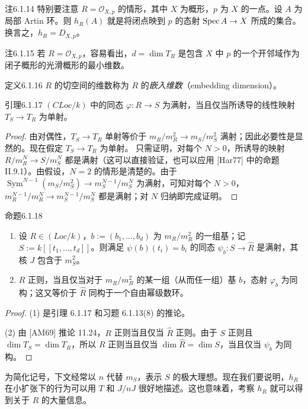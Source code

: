 \begin{origstatement}{注}{6.1.14}\label{ch06:6.1.14}
特别要注意 $R=\mathcal O_{X,p}$ 的情形，其中 $X$ 为概形，$p$ 为 $X$ 的一点。设 $A$ 为局部 Artin 环。则 $h_R(A)$ 就是将闭点映到 $p$ 的态射 $\operatorname{Spec} A\to X$ 所成的集合。换言之，$h_R=D_{X,p}$。
\end{origstatement}
\begin{origstatement}{注}{6.1.15}\label{ch06:6.1.15}
若 $R=\mathcal O_{X,p}$，容易看出，$d=\dim T_R$ 是包含 $X$ 中 $p$ 的一个开邻域作为闭子概形的光滑概形的最小维数。
\end{origstatement}
\begin{origstatement}{定义}{6.1.16}\label{ch06:6.1.16}
$R$ 的切空间的维数称为 $R$ 的\emph{嵌入维数}（embedding dimension）。
\end{origstatement}
\begin{origstatement}{引理}{6.1.17}\label{ch06:6.1.17}
$(CLoc/k)$ 中的同态 $\varphi:R\to S$ 为满射，当且仅当所诱导的线性映射 $T_S\to T_R$ 为单射。
\end{origstatement}
\begin{proof}
由对偶性，$T_S\to T_R$ 单射等价于 $m_R/m_R^2\to m_S/m_S^2$ 满射；因此必要性是显然的。现在假定 $T_S\to T_R$ 为单射。
只需证明，对每个 $N>0$，所诱导的映射 $R/m_R^N\to S/m_S^N$ 都是满射（这可以直接验证，也可以应用 [Har77] 中的命题 II.9.1）。由假设，$N=2$ 的情形是清楚的。由于 $\operatorname{Sym}^{N-1}(m_S/m_S^2)\to m_S^{N-1}/m_S^N$ 为满射，可知对每个 $N>0$，$m_R^{N-1}/m_R^N\to m_S^{N-1}/m_S^N$ 都是满射；对 $N$ 归纳即完成证明。
\end{proof}
\begin{origstatement}{命题}{6.1.18}\label{ch06:6.1.18}
\begin{enumerate}[label=(\arabic*)]
\item 设 $R\in(Loc/k)$，$b:=(b_1,\ldots,b_d)$ 为 $m_R/m_R^2$ 的一组基；记 $S:=k[[t_1,\ldots,t_d]]$。则满足 $\psi(b)(t_i)=b_i$ 的同态 $\psi_b:S\to\widehat R$ 是满射，其核 $J$ 包含于 $m_S^2$。
\item $R$ 正则，当且仅当对于 $m_R/m_R^2$ 的某一组（从而任一组）基 $b$，态射 $\varphi_b$ 为同构；这又等价于 $\widehat R$ 同构于一个自由幂级数环。
\end{enumerate}
\end{origstatement}
\begin{proof}
(1) 是引理 6.1.17 和习题 6.1.13(8) 的推论。

(2) 由 [AM69] 推论 11.24，$R$ 正则当且仅当 $\widehat R$ 正则。由于 $S$ 正则且 $\dim T_S=\dim T_R$，所以 $R$ 正则当且仅当 $\dim\widehat R=\dim S$，当且仅当 $\psi_b$ 为同构。
\end{proof}
为简化记号，下文经常以 $n$ 代替 $m_S$，表示 $S$ 的极大理想。现在我们要说明，$h_R$ 在小扩张下的行为可以用 $T$ 和 $J/nJ$ 很好地描述。这也意味着，考察 $h_R$ 就可以得到关于 $R$ 的大量信息。

